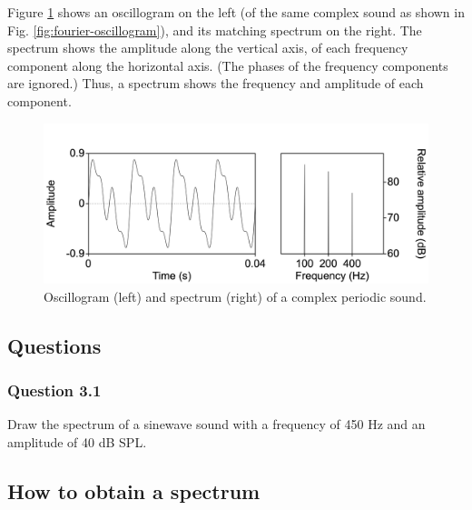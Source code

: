 \documentclass[
]{book}
\begin{document}
Figure \ref{fig:complex100n200n400} shows an oscillogram on the left (of the same complex sound as shown in Fig. \ref{fig:fourier-oscillogram}), and its matching spectrum on the right. The spectrum shows the amplitude along the vertical axis, of each frequency component along the horizontal axis. (The phases of the frequency components are ignored.) Thus, a spectrum shows the frequency and amplitude of each component.

\begin{figure}

{\centering \includegraphics{figures/complex100n200n400} 

}

\caption{Oscillogram (left) and spectrum (right) of a complex periodic sound.}\label{fig:complex100n200n400}
\end{figure}

\label{questions-spectrum}
\subsection*{Questions}\label{questions-2}

\subsubsection*{Question 3.1}\label{question-3.1}

Draw the spectrum of a sinewave sound with a frequency of 450 Hz and an amplitude of 40 dB SPL.

\label{box-praatspectrum}
\subsection{How to obtain a spectrum}\label{how-to-obtain-a-spectrum}
\end{document}
